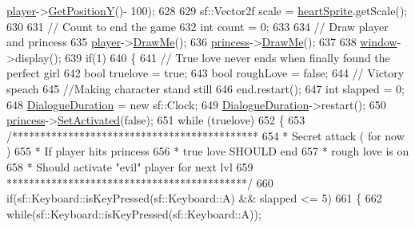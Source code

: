 \begin{DoxyCode}
      \hyperlink{classTestApp_a72c21fba56a65699606328b9e765d6db}{player}->\hyperlink{classPlayerObject_ad17b9ec44299f4dc9ca20064c883496b}{GetPositionY}()- 100);
628 
629         sf::Vector2f scale = \hyperlink{classTestApp_a9f761bf2b2ac16536a2459ae6730f0c0}{heartSprite}.getScale();
630 
631         \textcolor{comment}{// Count to end the game}
632         \textcolor{keywordtype}{int} count = 0;
633 
634         \textcolor{comment}{// Draw player and princess}
635         \hyperlink{classTestApp_a72c21fba56a65699606328b9e765d6db}{player}->\hyperlink{classPlayerObject_a510e91305c929bb86d7628b87b0d7e39}{DrawMe}();
636         \hyperlink{classTestApp_a99d5d1cabf9afb7550bac5a504f72875}{princess}->\hyperlink{classPrincessObject_a530610d0d21f1ec24e0d5af175ebc6eb}{DrawMe}();
637 
638         \hyperlink{classTestApp_a0b6b080a777092db64519ef7c4309105}{window}->display();
639         \textcolor{keywordflow}{if}(1)
640         \{
641             \textcolor{comment}{// True love never ends when finally found the perfect girl}
642             \textcolor{keywordtype}{bool} truelove = \textcolor{keyword}{true};
643             \textcolor{keywordtype}{bool} roughLove = \textcolor{keyword}{false};
644             \textcolor{comment}{// Victory speach}
645             \textcolor{comment}{//Making character stand still}
646             end.restart();
647             \textcolor{keywordtype}{int} slapped = 0;
648             \hyperlink{classTestApp_ab17fb7269fa0caf564a3f462f2e16b4a}{DialogueDuration} = \textcolor{keyword}{new} sf::Clock;
649             \hyperlink{classTestApp_ab17fb7269fa0caf564a3f462f2e16b4a}{DialogueDuration}->restart();
650             \hyperlink{classTestApp_a99d5d1cabf9afb7550bac5a504f72875}{princess}->\hyperlink{classPrincessObject_ad4fed7d55ec5432c65525f7c82ac0077}{SetActivated}(\textcolor{keyword}{false});
651             \textcolor{keywordflow}{while} (truelove)
652             \{
653                 \textcolor{comment}{/********************************************}
654 \textcolor{comment}{                 * Secret attack ( for now )}
655 \textcolor{comment}{                 * If player hits princess}
656 \textcolor{comment}{                 * true love SHOULD end}
657 \textcolor{comment}{                 * rough love is on}
658 \textcolor{comment}{                 * Should activate "evil" player for next lvl}
659 \textcolor{comment}{                 *******************************************/}
660                 \textcolor{keywordflow}{if}(sf::Keyboard::isKeyPressed(sf::Keyboard::A) && slapped <= 5)
661                 \{
662                     \textcolor{keywordflow}{while}(sf::Keyboard::isKeyPressed(sf::Keyboard::A));

\end{DoxyCode}
